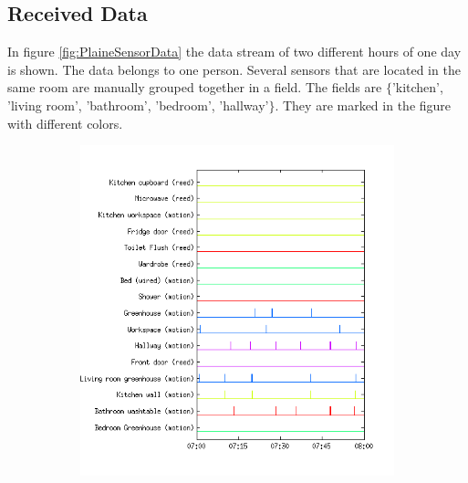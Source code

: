 \documentclass[a4paper,fleqn]{article}
\begin{document}
\subsection{Received Data}
In figure \ref{fig:PlaineSensorData} the data stream of two different hours of one day is shown. The data belongs to one person. Several sensors that are located in the same room are manually grouped together in a field. The fields are $\{$'kitchen', 'living room', 'bathroom', 'bedroom', 'hallway'$\}$. They are marked in the figure with different colors.

\begin{figure}[h!]
  \centering
  \begin{subfigure}[b]{0.45\textwidth}
    \centering
    \includegraphics[width=\textwidth]{Pictures/SensorsMorningHN3Day34.png}
  \end{subfigure}
  ~
  \begin{subfigure}[b]{0.45\textwidth}
    \centering

\end{subfigure}
\end{figure}
\end{document}
